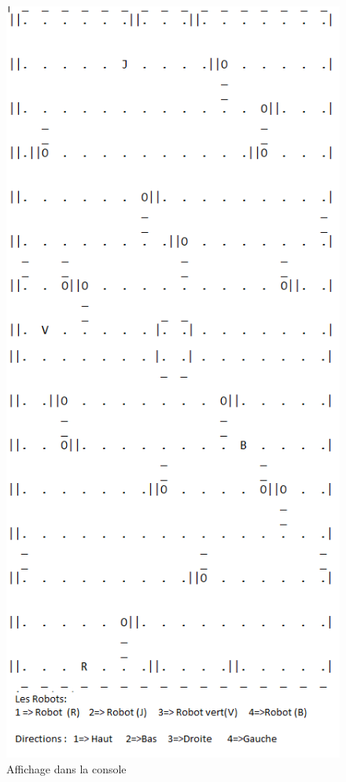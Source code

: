 \documentclass[12pt]{article}
\begin{document}
	\newpage
			\begin{figure}[htpb]
			\includegraphics[scale=0.5]{./images/jeuConsole.png}
			\caption{Affichage dans la console}
			\end{figure}
			
\end{document}
